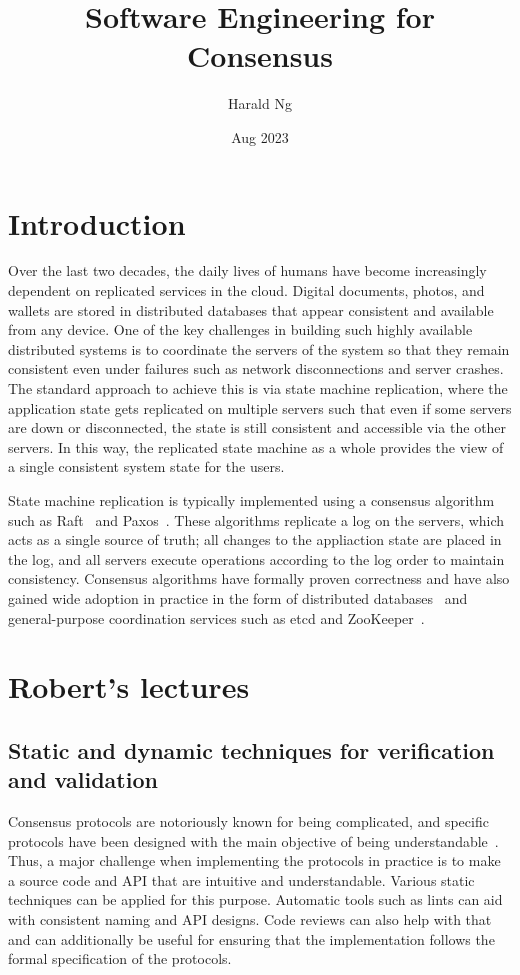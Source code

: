 \documentclass[11pt]{article}
\title{Software Engineering for Consensus}
\author{Harald Ng}
\date{Aug 2023}
\begin{document}
\maketitle

\section{Introduction}
Over the last two decades, the daily lives of humans have become increasingly dependent on replicated services in the cloud. Digital documents, photos, and wallets are stored in distributed databases that appear consistent and available from any device. One of the key challenges in building such highly available distributed systems is to coordinate the servers of the system so that they remain consistent even under failures such as network disconnections and server crashes. The standard approach to achieve this is via state machine replication, where the application state gets replicated on multiple servers such that even if some servers are down or disconnected, the state is still consistent and accessible via the other servers. In this way, the replicated state machine as a whole provides the view of a single consistent system state for the users.

State machine replication is typically implemented using a consensus algorithm such as Raft~\cite{ongaro2014search} and Paxos~\cite{Lamport2001PaxosMS}. These algorithms replicate a log on the servers, which acts as a single source of truth; all changes to the appliaction state are placed in the log, and all servers execute operations according to the log order to maintain consistency. Consensus algorithms have formally proven correctness and have also gained wide adoption in practice in the form of distributed databases~\cite{corbett2013spanner, taft2020cockroachdb, huang2020tidb} and general-purpose coordination services such as etcd and ZooKeeper~\cite{hunt2010zookeeper}.

\section{Robert's lectures}

\subsection{Static and dynamic techniques for verification and validation}
Consensus protocols are notoriously known for being complicated, and specific protocols have been designed with the main objective of being understandable~\cite{ongaro2014search}. Thus, a major challenge when implementing the protocols in practice is to make a source code and API that are intuitive and understandable. Various static techniques can be applied for this purpose. Automatic tools such as lints can aid with consistent naming and API designs. Code reviews can also help with that and can additionally be useful for ensuring that the implementation follows the formal specification of the protocols.
\end{document}
